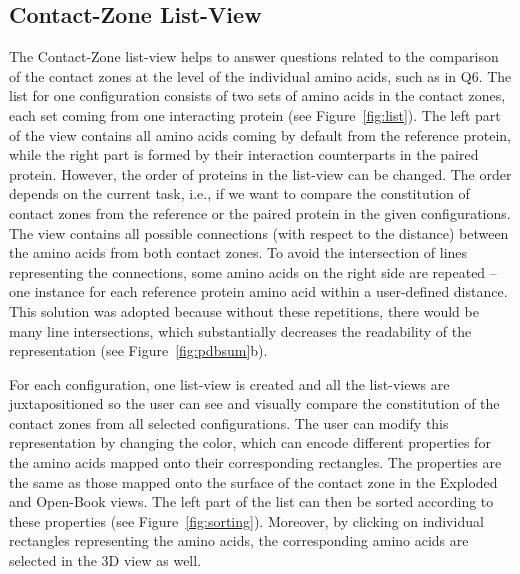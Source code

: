 \documentclass{bmcart}
\def\CoZoListView {Contact-Zone list-view\xspace}
\begin{document}
\subsection*{Contact-Zone List-View}
The \CoZoListView helps to answer questions related to the comparison of the contact zones at the level of the individual amino acids, such as in Q6.
The list for one configuration consists of two sets of amino acids in the contact zones, each set coming from one interacting protein (see Figure~\ref{fig:list}).
The left part of the view contains all amino acids coming by default from the reference protein, while the right part is formed by their interaction counterparts in the paired protein.
However, the order of proteins in the list-view can be changed.
The order depends on the current task, i.e., if we want to compare the constitution of contact zones from the reference or the paired protein in the given configurations.
The view contains all possible connections (with respect to the distance) between the amino acids from both contact zones.
To avoid the intersection of lines representing the connections, some amino acids on the right side are repeated -- one instance for each reference protein amino acid within a user-defined distance. 
This solution was adopted because without these repetitions, there would be many line intersections, which substantially decreases the readability of the representation (see Figure~\ref{fig:pdbsum}b).

For each configuration, one list-view is created and all the list-views are juxtapositioned so the user can see and visually compare the constitution of the contact zones from all selected configurations.
The user can modify this representation by changing the color, which can encode different properties for the amino acids mapped onto their corresponding rectangles.
The properties are the same as those mapped onto the surface of the contact zone in the Exploded and Open-Book views.
The left part of the list can then be sorted according to these properties (see Figure~\ref{fig:sorting}).
Moreover, by clicking on individual rectangles representing the amino acids, the corresponding amino acids are selected in the 3D view as well.
\end{document}
